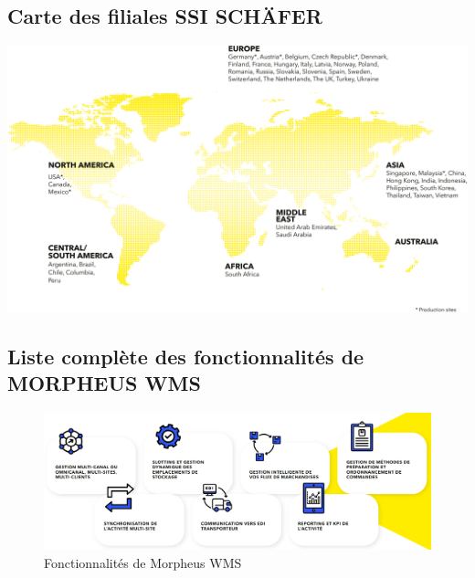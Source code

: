 \documentclass[a4paper, 12pt, french]{article}
\begin{document}
		\newpage
		\subsection{Carte des filiales SSI SCHÄFER}\label{appendix:map}
			\begin{center}
				\includegraphics[width=\textwidth]{images/world_map.jpg}
			\end{center}
		\newpage


		\subsection{Liste complète des fonctionnalités de MORPHEUS WMS}\label{appendix:morpheusWMSFonctionnalites}
			\begin{figure}[h!]
					\includegraphics[width=\linewidth]{images/morpheus_wms_fonctionnalites.png}
					\caption{Fonctionnalités de Morpheus WMS}%
					\label{fig:morpheus_wms_fonctionnalites}
			\end{figure}
\end{document}
